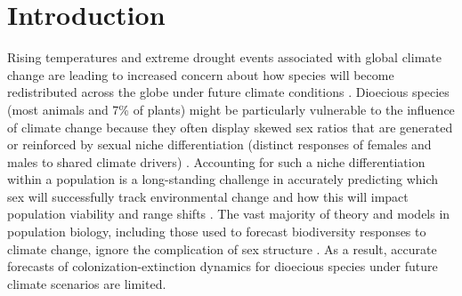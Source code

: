 \documentclass[12pt]{article}
\newcommand{\tom}[2]{{\color{red}{#1}}\footnote{\textit{\color{red}{#2}}}}
\begin{document}
\newpage
\section*{Introduction}
Rising temperatures and extreme drought events associated with global climate change are leading to increased concern about how species will become redistributed across the globe under future climate conditions \citep{bertrand2011changes,gamelon2017interactions,smith2024extreme}.
Dioecious species (most animals and 7\% of plants) might be particularly vulnerable to the influence of climate change because they often display skewed sex ratios that are generated or reinforced by sexual niche differentiation (distinct responses of females and males to shared climate drivers) \citep{Tognetti2012}. 
Accounting for such a niche differentiation within a population is a long-standing challenge in accurately predicting which sex will successfully track environmental change and how this will impact population viability and range shifts \citep{jones1999sex,gissi2023exploring}. 
The vast majority of theory and models in population biology, including those used to forecast biodiversity responses to climate change, ignore the complication of sex structure \citep{pottier2021sexual,ellis2017does,Elena}.
As a result, accurate forecasts of colonization-extinction dynamics for dioecious species under future climate scenarios are limited.

\end{document}
